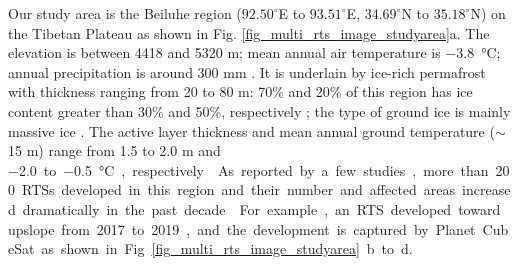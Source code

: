 \documentclass[authoryear,preprint,review,12pt]{elsarticle}
\begin{document}
Our study area is the Beiluhe region ($92.50^\circ$E to $93.51^\circ$E, $34.69^\circ$N to $35.18^\circ$N) on the Tibetan Plateau as shown in Fig. \ref{fig_multi_rts_image_studyarea}a.
The elevation is between 4418 and 5320 m; mean annual air temperature is \SI{-3.8}{\celsius}; annual precipitation is around 300 mm  \citep{luo_thermokarst_2015}.
It is underlain by ice-rich permafrost with thickness ranging from 20 to 80 m: 70\% and 20\% of this region has ice content greater than 30\% and 50\%, respectively \citep{zhou_geocryology_2000, luo_thermokarst_2015}; 
the type of ground ice is mainly massive ice \citep{guodong1983mechanism}. 
The active layer thickness and mean annual ground temperature ($\sim$15 m) range from 1.5 to 2.0 m and \SI{-2.0} to \SI{-0.5}{\celsius}, respectively \citep{zhou_geocryology_2000, wu2010changes, luo_thermokarst_2015,  wu2015changes}. 
As reported by a few studies, more than 200 RTSs developed in this region and their number and affected areas increased dramatically in the past decade \citep{huang2020using,luo2019recent}.  
For example, an RTS developed toward upslope from 2017 to 2019, and the development is captured by Planet CubeSat as shown in Fig. \ref{fig_multi_rts_image_studyarea}b to d. 


\end{document}
